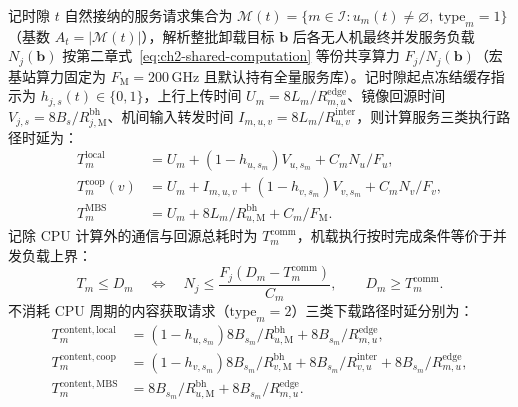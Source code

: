 记时隙 $t$ 自然接纳的服务请求集合为 $\mathcal{M}(t)=\{m\in\mathcal{I}:u_m(t)\neq\varnothing,\ \mathrm{type}_m=1\}$（基数 $A_t=|\mathcal{M}(t)|$），解析整批卸载目标 $\mathbf{b}$ 后各无人机最终并发服务负载 $N_j(\mathbf{b})$ 按第二章式~\eqref{eq:ch2-shared-computation} 等份共享算力 $F_j/N_j(\mathbf{b})$（宏基站算力固定为 $F_{\mathrm{M}}=200\,\mathrm{GHz}$ 且默认持有全量服务库）。记时隙起点冻结缓存指示为 $h_{j,s}(t)\in\{0,1\}$，上行上传时间 $U_m=8L_m/R^{\mathrm{edge}}_{m,u}$、镜像回源时间 $V_{j,s}=8B_s/R^{\mathrm{bh}}_{j,\mathrm{M}}$、机间输入转发时间 $I_{m,u,v}=8L_m/R^{\mathrm{inter}}_{u,v}$，则计算服务三类执行路径时延为：
\begin{equation}
 \begin{aligned}
 T_m^{\mathrm{local}}&=U_m+(1-h_{u,s_m})V_{u,s_m}+C_mN_u/F_u,\\
 T_m^{\mathrm{coop}}(v)&=U_m+I_{m,u,v}+(1-h_{v,s_m})V_{v,s_m}+C_mN_v/F_v,\\
 T_m^{\mathrm{MBS}}&=U_m+8L_m/R^{\mathrm{bh}}_{u,\mathrm M}+C_m/F_{\mathrm M}.
 \end{aligned}
 \label{eq:ch3-service-three-paths}
\end{equation}
记除 CPU 计算外的通信与回源总耗时为 $T_m^{\mathrm{comm}}$，机载执行按时完成条件等价于并发负载上界：
\begin{equation}
 T_m\leq D_m
 \quad\Longleftrightarrow\quad
 N_j\leq\frac{F_j(D_m-T_m^{\mathrm{comm}})}{C_m},
 \qquad D_m\geq T_m^{\mathrm{comm}}.
 \label{eq:ch3-deadline-load-budget}
\end{equation}
不消耗 CPU 周期的内容获取请求（$\mathrm{type}_m=2$）三类下载路径时延分别为：
\begin{equation}
 \begin{aligned}
 T_m^{\mathrm{content,local}}&=(1-h_{u,s_m})8B_{s_m}/R^{\mathrm{bh}}_{u,\mathrm M}
                             +8B_{s_m}/R^{\mathrm{edge}}_{m,u},\\
 T_m^{\mathrm{content,coop}}&=(1-h_{v,s_m})8B_{s_m}/R^{\mathrm{bh}}_{v,\mathrm M}
              +8B_{s_m}/R^{\mathrm{inter}}_{v,u}+8B_{s_m}/R^{\mathrm{edge}}_{m,u},\\
 T_m^{\mathrm{content,MBS}}&=8B_{s_m}/R^{\mathrm{bh}}_{u,\mathrm M}
                           +8B_{s_m}/R^{\mathrm{edge}}_{m,u}.
 \end{aligned}
 \label{eq:ch3-content-three-paths}
\end{equation}

